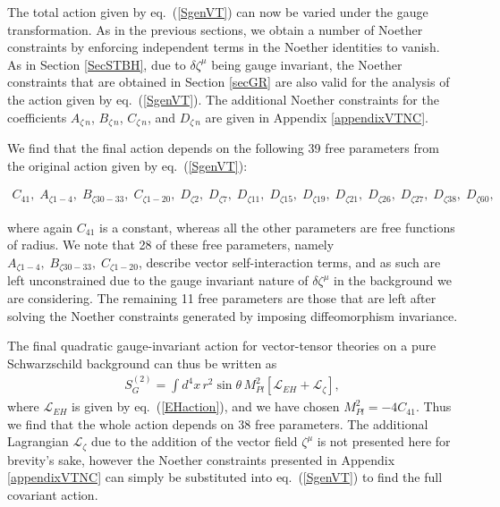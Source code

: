 \documentclass[10pt,twocolumn,preprintnumbers,amsmath,amssymb,nofootinbib
,superscriptaddress]{revtex4-1}
\begin{document}
{The total action given by eq.~(\ref{SgenVT}) can now be varied under the gauge transformation. As in the previous sections, we obtain a number of Noether constraints by enforcing independent terms in the Noether identities to vanish. As in Section \ref{SecSTBH}, due to $\delta\zeta^\mu$ being gauge invariant, the Noether constraints that are obtained in Section \ref{secGR} are also valid for the analysis of the action given by eq.~(\ref{SgenVT}). The additional Noether constraints for the coefficients $A_{\zeta\,n}$, $B_{\zeta\,n}$, $C_{\zeta\,n}$, and $D_{\zeta\,n}$ are given in Appendix \ref{appendixVTNC}.

We find that the final action depends on the following 39 free parameters from the original action given by eq.~(\ref{SgenVT}):
\begin{widetext}
\begin{align}
C_{41},\;A_{\zeta 1-4},\;B_{\zeta 30-33}, \;C_{\zeta 1-20}, \;D_{\zeta2},\; D_{\zeta7}, \;D_{\zeta11},\; D_{\zeta15}, \;D_{\zeta19}, \;D_{\zeta21},\; D_{\zeta26}, \;D_{\zeta27}, \;D_{\zeta38},\; D_{\zeta60},\label{VTparameters}
\end{align}
\end{widetext}
where again $C_{41}$ is a constant, whereas all the other parameters are free functions of radius. We note that 28 of these free parameters, namely $A_{\zeta 1-4},\;B_{\zeta 30-33}, \;C_{\zeta 1-20}$, describe vector self-interaction terms, and as such are left unconstrained due to the gauge invariant nature of $\delta\zeta^\mu$ in the background we are considering. The remaining 11 free parameters are those that are left after solving the Noether constraints generated by imposing diffeomorphism invariance.

The final quadratic gauge-invariant action for vector-tensor theories on a pure Schwarzschild background can thus be written as
\begin{align}
S^{(2)}_G=\int d^4x\,r^2\sin\theta\,M_{Pl}^2\left[\mathcal{L}_{EH}+\mathcal{L}_{\zeta}\right],\label{LfinalVT}
\end{align}
where $\mathcal{L}_{EH}$ is given by eq.~(\ref{EHaction}), and we have chosen $M_{Pl}^2=-4C_{41}$. Thus we find that the whole action depends on 38 free parameters. The additional Lagrangian $\mathcal{L}_{\zeta}$ due to the addition of the vector field $\zeta^\mu$ is not presented here for brevity's sake, however the Noether constraints presented in Appendix \ref{appendixVTNC} can simply be substituted into eq.~(\ref{SgenVT}) to find the full covariant action.

}
\end{document}
